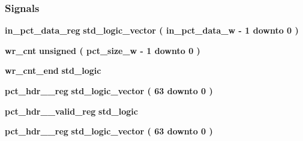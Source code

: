 \subsubsection*{Signals}
 \begin{DoxyCompactItemize}
\item 
{\bf in\+\_\+pct\+\_\+data\+\_\+reg} {\bfseries \textcolor{comment}{std\+\_\+logic\+\_\+vector}\textcolor{vhdlchar}{ }\textcolor{vhdlchar}{(}\textcolor{vhdlchar}{ }\textcolor{vhdlchar}{ }\textcolor{vhdlchar}{ }\textcolor{vhdlchar}{ }{\bfseries {\bf in\+\_\+pct\+\_\+data\+\_\+w}} \textcolor{vhdlchar}{-\/}\textcolor{vhdlchar}{ } \textcolor{vhdldigit}{1} \textcolor{vhdlchar}{ }\textcolor{keywordflow}{downto}\textcolor{vhdlchar}{ }\textcolor{vhdlchar}{ } \textcolor{vhdldigit}{0} \textcolor{vhdlchar}{ }\textcolor{vhdlchar}{)}\textcolor{vhdlchar}{ }} 
\item 
{\bf wr\+\_\+cnt} {\bfseries \textcolor{comment}{unsigned}\textcolor{vhdlchar}{ }\textcolor{vhdlchar}{(}\textcolor{vhdlchar}{ }\textcolor{vhdlchar}{ }\textcolor{vhdlchar}{ }\textcolor{vhdlchar}{ }{\bfseries {\bf pct\+\_\+size\+\_\+w}} \textcolor{vhdlchar}{-\/}\textcolor{vhdlchar}{ } \textcolor{vhdldigit}{1} \textcolor{vhdlchar}{ }\textcolor{keywordflow}{downto}\textcolor{vhdlchar}{ }\textcolor{vhdlchar}{ } \textcolor{vhdldigit}{0} \textcolor{vhdlchar}{ }\textcolor{vhdlchar}{)}\textcolor{vhdlchar}{ }} 
\item 
{\bf wr\+\_\+cnt\+\_\+end} {\bfseries \textcolor{comment}{std\+\_\+logic}\textcolor{vhdlchar}{ }} 
\item 
{\bf pct\+\_\+hdr\+\_\+\_\+reg} {\bfseries \textcolor{comment}{std\+\_\+logic\+\_\+vector}\textcolor{vhdlchar}{ }\textcolor{vhdlchar}{(}\textcolor{vhdlchar}{ }\textcolor{vhdlchar}{ } \textcolor{vhdldigit}{63} \textcolor{vhdlchar}{ }\textcolor{keywordflow}{downto}\textcolor{vhdlchar}{ }\textcolor{vhdlchar}{ } \textcolor{vhdldigit}{0} \textcolor{vhdlchar}{ }\textcolor{vhdlchar}{)}\textcolor{vhdlchar}{ }} 
\item 
{\bf pct\+\_\+hdr\+\_\+\_\+valid\+\_\+reg} {\bfseries \textcolor{comment}{std\+\_\+logic}\textcolor{vhdlchar}{ }} 
\item 
{\bf pct\+\_\+hdr\+\_\+\_\+reg} {\bfseries \textcolor{comment}{std\+\_\+logic\+\_\+vector}\textcolor{vhdlchar}{ }\textcolor{vhdlchar}{(}\textcolor{vhdlchar}{ }\textcolor{vhdlchar}{ } \textcolor{vhdldigit}{63} \textcolor{vhdlchar}{ }\textcolor{keywordflow}{downto}\textcolor{vhdlchar}{ }\textcolor{vhdlchar}{ } \textcolor{vhdldigit}{0} \textcolor{vhdlchar}{ }\textcolor{vhdlchar}{)}\textcolor{vhdlchar}{ }} 

\end{DoxyCompactItemize}

